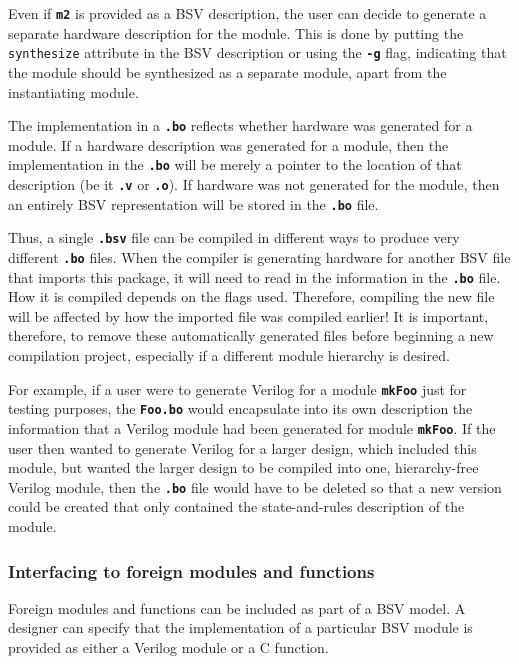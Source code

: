 \documentclass{article}
\newcommand{\te}[1]{\texttt{#1}}
\begin{document}
Even if {\bf\tt m2} is provided as a BSV description, the user can
decide to generate a separate hardware description for the module.
This is done by putting the \te{synthesize} attribute in the BSV
description   or using the
{\bf\tt -g} flag, indicating that
 the module should be synthesized
as a separate module, apart from the instantiating module.

\index{.bo@\te{.bo} (file type)}
 The
implementation in a {\bf\tt .bo} reflects whether hardware was
generated for a module.  If a hardware description was generated for a
module, then the implementation in the {\bf\tt .bo} will be merely a
pointer to the location of that description (be it {\bf\tt .v} or
{\bf\tt .o}). If hardware was not generated for the module, then an
entirely BSV representation will be stored in the {\bf\tt .bo} file.

Thus, a single {\bf\tt .bsv} file can be compiled in different ways to
produce very different {\bf\tt .bo} files.  When the
compiler is generating hardware for another BSV file that imports this
package, it will need to read in the information in the {\bf\tt .bo}
file. How it is compiled depends on the flags used. Therefore, compiling the
new file will be affected by how the imported file was compiled earlier!  It
is important, therefore, to remove these automatically generated files
before beginning a new compilation project, especially if a different
module hierarchy is desired.

For example, if a user were to generate Verilog for a module {\bf\tt mkFoo}
just for testing purposes, the {\bf\tt Foo.bo} would encapsulate into its
own description the information that a Verilog module had been generated
for module {\bf\tt mkFoo}.  If the user then wanted to generate Verilog for a
larger design, which included this module, but wanted the larger design
to be compiled into one, hierarchy-free Verilog module, then the {\bf\tt .bo} file would
have to be deleted so that a new version could be created that only
contained the state-and-rules description of the module.


\subsubsection{Interfacing to foreign modules and functions}
Foreign modules and functions can be included as part of a BSV model.
A designer can specify that the implementation of a particular BSV
module is provided as either a Verilog module or a C function.
\end{document}
